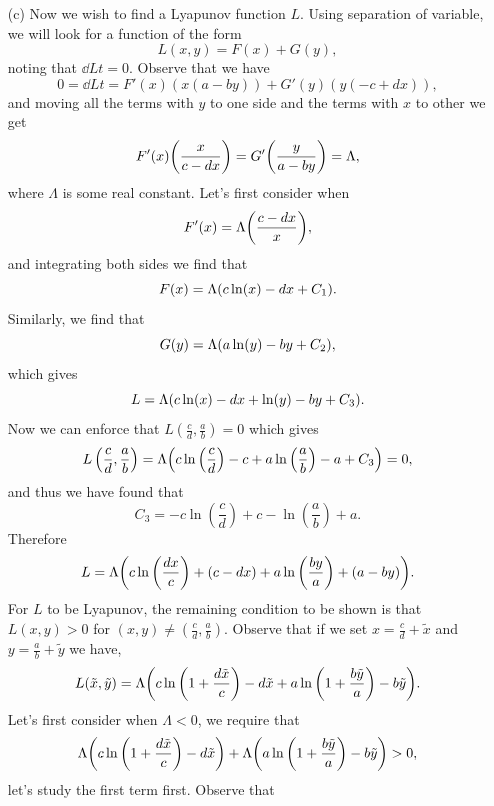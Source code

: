 \documentclass[12pt]{report}
\begin{document}
\begin{solution}
\begin{enumerate}
        \item [(c)]
            Now we wish to find a Lyapunov function $L$. Using separation of variable, we will look for a function of the form
            \[ 
                L(x,y) = F(x) + G(y),
            \]
            noting that $\dd{L}{t} = 0$. Observe that we have
            \[ 
                0 = \dd{L}{t} = F'(x)(x(a-by)) + G'(y)(y(-c + dx)),
            \]
            and moving all the terms with $y$ to one side and the terms with $x$ to other we get
            \[ 
                F'(x) {\left(\frac{x}{c - dx}\right)} = G'{\left(\frac{y}{a-by}\right)} = \Lambda,
            \]
            where $\Lambda$ is some real constant. Let's first consider when
            \[ 
                F'(x)  = \Lambda{\left(\frac{c - dx}{x}\right)},
            \]
            and integrating both sides we find that
            \[ 
                F(x) = \Lambda{\left(c \ln(x) - dx + C_1\right)}.
            \]
            Similarly, we find that
            \[ 
                G(y) = \Lambda{\left(a \ln(y) - by + C_2\right)},
            \] 
            which gives
            \[ 
                L = \Lambda{\left(c \ln(x) - dx + \ln(y) - by + C_3\right)}.
            \]
            Now we can enforce that $L\left(\frac{c}{d},\frac{a}{b}\right) = 0$ which gives
            \[ 
            L\left(\frac{c}{d},\frac{a}{b}\right) = \Lambda{\left(c \ln\left(\frac{c}{d}\right) - c + a\ln\left(\frac{a}{b}\right) - a + C_3\right)} = 0,
            \]
            and thus we have found that
            \[ 
                C_3 = -c \ln\left(\frac{c}{d}\right) + c - \ln\left(\frac{a}{b}\right) + a. 
            \]
            Therefore 
            \[
                L = \Lambda{\left(c \ln{\left(\frac{dx}{c}\right)} + (c - dx) + a\ln{\left(\frac{by}{a}\right)} + (a- by)\right)}.
            \]
            For $L$ to be Lyapunov, the remaining condition to be shown is that $L(x,y) > 0$ for $(x,y) \neq \left(\frac{c}{d},\frac{a}{b}\right)$. Observe that if we set $x= \frac{c}{d} + \tilde{x}$ and $y = \frac{a}{b} + \tilde{y}$ we have,
            \[ 
                L(\tilde{x},\tilde{y}) = \Lambda{\left(c \ln{\left(1 + \frac{d\tilde{x}}{c}\right)} - d\tilde{x} + a\ln{\left(1 + \frac{b\tilde{y}}{a}\right)} - b\tilde{y}\right)}.
            \]
            Let's first consider when $\Lambda < 0$, we require that 
            \[ 
                \Lambda{\left(c \ln{\left(1 + \frac{d\tilde{x}}{c}\right)} - d\tilde{x}\right)} + \Lambda {\left(a\ln{\left(1 + \frac{b\tilde{y}}{a}\right)} - b\tilde{y}\right)} > 0,
            \]
            let's study the first term first. Observe that
            \begin{align*}

\end{align*}
\end{enumerate}
\end{solution}
\end{document}
